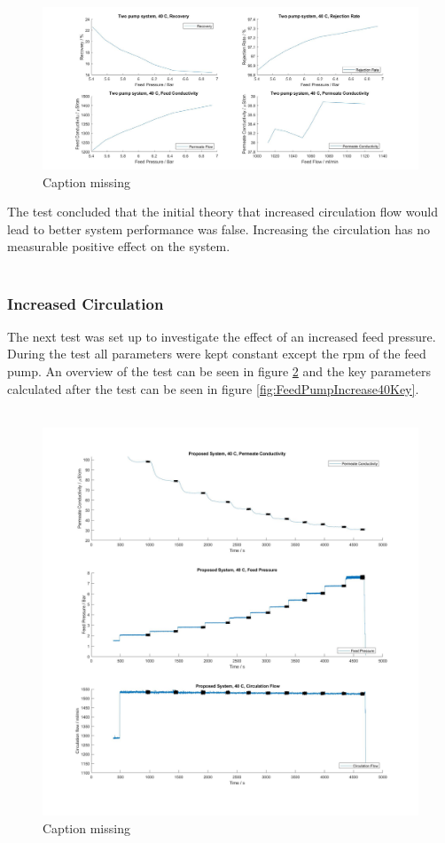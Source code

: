 \\
\begin{figure}[H]
    \centering
    \includegraphics[width=1.1\textwidth]{RecIncrease40Key}
    \caption{Caption missing}
    \label{fig:RecIncreaseKey40K}
\end{figure} 
\par\bigskip 
\noindent
The test concluded that the initial theory that increased circulation flow would lead to better system performance was false. Increasing the circulation has no measurable positive effect on the system. \\
\\
\newpage
\subsubsection{Increased Circulation}
The next test was set up to investigate the effect of an increased feed pressure. During the test all parameters were kept constant except the rpm of the feed pump. An overview of the test can be seen in figure \ref{fig:FeedPumpIncrease40} and the key parameters calculated after the test can be seen in figure \ref{fig:FeedPumpIncrease40Key}.\\
\\
\begin{figure}[H]
    \centering
    \includegraphics[width=1.1\textwidth]{FeedPumpIncrease40}
    \caption{Caption missing}
    \label{fig:FeedPumpIncrease40}
\end{figure}

